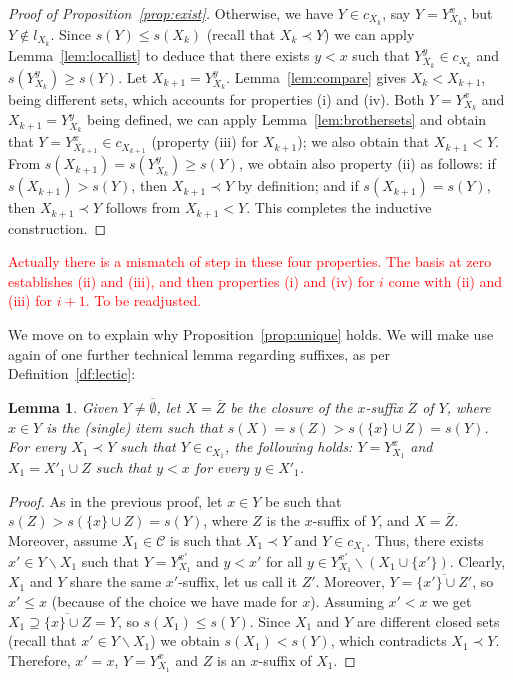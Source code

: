 \documentclass{article}
\newtheorem{lemma}{Lemma}
\newcommand{\deleted}[1]{\textcolor{red}{#1}}
\def\C{\mathcal{C}}
\def\s{\mathit{s}}
\newcommand{\cl}[1]{\overline{#1}}
\def\bef{\prec}
\begin{document}
\begin{proof}[Proof of Proposition~\ref{prop:exist}]
Otherwise, we have 
$Y \in c_{X_k}$, say $Y=Y^{x}_{X_k}$, but
$Y \notin l_{X_k}$. Since $\s(Y) \leq \s(X_k)$ (recall that $X_k \bef Y$) we can apply Lemma~\ref{lem:locallist}
to deduce that there exists $y<x$ such that 
$Y^y_{X_k} \in c_{X_k}$ and $\s(Y^y_{X_k}) \geq \s(Y)$. 
Let $X_{k+1} = Y^y_{X_k}$. 
Lemma~\ref{lem:compare} gives $X_k < X_{k+1}$,
being different sets, which accounts for properties (i) and (iv).
Both $Y=Y^{x}_{X_k}$ and $X_{k+1} = Y^y_{X_k}$ being defined, 
we can apply Lemma~\ref{lem:brothersets} and obtain that
$Y = Y^x_{X_{k+1}}\in c_{X_{k+1}}$ 
(property (iii) for $X_{k+1}$);
we also obtain that $X_{k+1} < Y$. From 
$s(X_{k+1}) = \s(Y^y_{X_k}) \geq \s(Y)$, we obtain
also property (ii) as follows: if 
$s(X_{k+1}) > \s(Y)$, then $X_{k+1} \bef Y$ by definition;
and if $s(X_{k+1}) = \s(Y)$, then $X_{k+1} \bef Y$ follows
from $X_{k+1} < Y$. This completes the inductive construction.
\end{proof}

\deleted{Actually there is a mismatch of step in these four
properties. The basis at zero establishes (ii) and (iii),
and then properties (i) and (iv) for $i$ come with (ii) and (iii)
for $i+1$. To be readjusted.}


We move on to explain why Proposition~\ref{prop:unique} holds.
We will make use again of one further technical lemma regarding
suffixes, as per Definition~\ref{df:lectic}:

\begin{lemma}\label{lem:otherantecs}
Given $Y \neq \cl{\emptyset}$,
let $X=\cl{Z}$ be the closure of the $x$-suffix $Z$ of $Y$, where $x\in Y$ is the (single) item such that $s(X) = s(Z) > s(\{x\}\cup Z) = s(Y)$.
For every $X_1 \bef Y$ such that $Y \in c_{X_1}$, the following
holds: $Y=Y^{x}_{X_1}$ and $X_1=X'_1 \cup Z$ such that $y < x$ for every $y\in X'_1$.
\end{lemma}

\begin{proof} %
As in the previous proof, let $x \in Y$ be such that $\s(Z) > \s(\{x\} \cup Z)=\s(Y)$, where $Z$ is the $x$-suffix of $Y$, and $X=\cl{Z}$. Moreover, assume $X_1 \in \C$ is such that $X_1 \bef Y$ and $Y \in c_{X_1}$. Thus, there exists  $x' \in Y \backslash X_1$ such that $Y=Y^{x'}_{X_1}$ and $y<x'$ for all $y \in Y^{x'}_{X_1} \backslash (X_1 \cup \{x'\})$.
Clearly, $X_1$ and $Y$ share the same $x'$-suffix, let us call it $Z'$. Moreover, $Y=\cl{\{x'\}\cup Z'}$, so $x' \leq x$ (because of the choice we have made for $x$). Assuming $x'<x$ we get $X_1 \supseteq \cl{\{x\}\cup Z}=Y$, so $\s(X_1) \leq \s(Y)$. Since $X_1$ and $Y$ are different closed sets (recall that $x' \in Y \backslash X_1$) we obtain $\s(X_1) < \s(Y)$, which contradicts $X_1 \bef Y$. Therefore, $x'=x$, $Y=Y^x_{X_1}$ and $Z$ is an $x$-suffix of $X_1$.
\end{proof}
\end{document}
